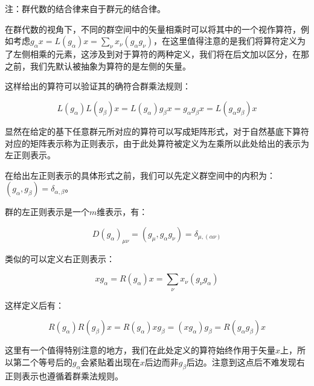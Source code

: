 注：群代数的结合律来自于群元的结合律。

在群代数的视角下，不同的群空间中的矢量相乘时可以将其中的一个视作算符，例如考虑$g_\alpha x=L(g_\alpha)x=\displaystyle\sum_\nu x_\nu (g_\alpha g_\nu)$，在这里值得注意的是我们将算符定义为了左侧相乘的元素，这涉及到对于算符的两种定义，我们将在后文加以区分，在那之前，我们先默认被抽象为算符的是左侧的矢量。

这样给出的算符可以验证其的确符合群乘法规则：

$$L(g_\alpha)L(g_\beta)x=L(g_\alpha)g_\beta x=g_\alpha g_\beta x=L(g_\alpha g_\beta)x$$

显然在给定的基下任意群元所对应的算符可以写成矩阵形式，对于自然基底下算符对应的矩阵表示称为正则表示，由于此处算符被定义为左乘所以此处给出的表示为左正则表示。

在给出左正则表示的具体形式之前，我们可以先定义群空间中的内积为：$(g_\alpha,g_\beta)=\delta_{\alpha,\beta}$。

群的左正则表示是一个$m$维表示，有：

$$D(g_\alpha)_{\mu\nu}=(g_\mu,g_\alpha g_\nu)=\delta_{\mu,(\alpha\nu)}$$

类似的可以定义右正则表示：

$$x g_\alpha=R(g_\alpha)x=\displaystyle\sum_\nu x_\nu (g_\nu g_\alpha)$$

这样定义后有：

$$R(g_\alpha)R(g_\beta)x=R(g_\alpha)x g_\beta= (x g_\alpha) g_\beta=R(g_\alpha g_\beta)x$$

这里有一个值得特别注意的地方，我们在此处定义的算符始终作用于矢量$x$上，所以第二个等号后的$g_\alpha$会紧贴着出现在$x$后边而非$g_\beta$后边。注意到这点后不难发现右正则表示也遵循着群乘法规则。